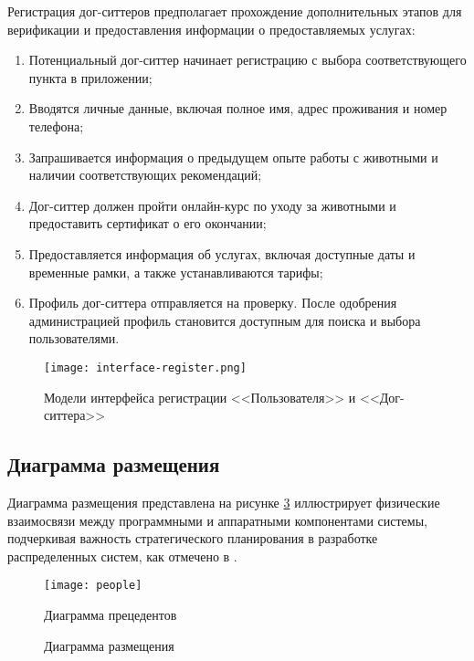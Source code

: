 Регистрация дог-ситтеров предполагает прохождение дополнительных этапов для верификации и предоставления информации о предоставляемых услугах:
\begin{enumerate}
    \item Потенциальный дог-ситтер начинает регистрацию с выбора соответствующего пункта в приложении;
    \item Вводятся личные данные, включая полное имя, адрес проживания и номер телефона;
    \item Запрашивается информация о предыдущем опыте работы с животными и наличии соответствующих рекомендаций;
    \item Дог-ситтер должен пройти онлайн-курс по уходу за животными и предоставить сертификат о его окончании;
    \item Предоставляется информация об услугах, включая доступные даты и временные рамки, а также устанавливаются тарифы;
    \item Профиль дог-ситтера отправляется на проверку. После одобрения администрацией профиль становится доступным для поиска и выбора пользователями.
\end{enumerate}


\begin{figure}[h!]
    \texttt{[image: interface-register.png]}
    \caption{Модели интерфейса регистрации <<Пользователя>> и <<Дог-ситтера>>}
    \label{fig:register}
\end{figure}

\subsection{Диаграмма размещения}
Диаграмма размещения представлена на рисунке \ref{place:image} иллюстрирует физические взаимосвязи между программными и аппаратными компонентами системы, подчеркивая важность стратегического планирования в разработке распределенных систем, как отмечено в \cite{makni}.


\begin{figure}[ht]
    \centering
    \texttt{[image: people]}
    \caption{Диаграмма прецедентов}
    \label{people:image}
    \end{figure}
    
\begin{figure}[ht]
\caption{Диаграмма размещения}
\label{place:image}
\end{figure}

